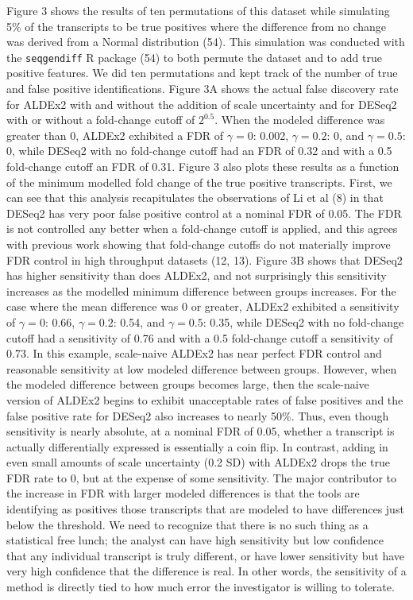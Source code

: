 \documentclass[
]{article}
\begin{document}
Figure 3 shows the results of ten permutations of this dataset while
simulating 5\% of the transcripts to be true positives where the
difference from no change was derived from a Normal distribution (54).
This simulation was conducted with the \texttt{seqgendiff} R package
(54) to both permute the dataset and to add true positive features. We
did ten permutations and kept track of the number of true and false
positive identifications. Figure 3A shows the actual false discovery
rate for ALDEx2 with and without the addition of scale uncertainty and
for DESeq2 with or without a fold-change cutoff of \(2^{0.5}\). When the
modeled difference was greater than 0, ALDEx2 exhibited a FDR of
\(\gamma = 0\): 0.002, \(\gamma = 0.2\): 0, and \(\gamma = 0.5\): 0,
while DESeq2 with no fold-change cutoff had an FDR of 0.32 and with a
0.5 fold-change cutoff an FDR of 0.31. Figure 3 also plots these results
as a function of the minimum modelled fold change of the true positive
transcripts. First, we can see that this analysis recapitulates the
observations of Li et al (8) in that DESeq2 has very poor false positive
control at a nominal FDR of 0.05. The FDR is not controlled any better
when a fold-change cutoff is applied, and this agrees with previous work
showing that fold-change cutoffs do not materially improve FDR control
in high throughput datasets (12, 13). Figure 3B shows that DESeq2 has
higher sensitivity than does ALDEx2, and not surprisingly this
sensitivity increases as the modelled minimum difference between groups
increases. For the case where the mean difference was 0 or greater,
ALDEx2 exhibited a sensitivity of \(\gamma = 0\): 0.66,
\(\gamma = 0.2\): 0.54, and \(\gamma = 0.5\): 0.35, while DESeq2 with no
fold-change cutoff had a sensitivity of 0.76 and with a 0.5 fold-change
cutoff a sensitivity of 0.73. In this example, scale-naive ALDEx2 has
near perfect FDR control and reasonable sensitivity at low modeled
difference between groups. However, when the modeled difference between
groups becomes large, then the scale-naive version of ALDEx2 begins to
exhibit unacceptable rates of false positives and the false positive
rate for DESeq2 also increases to nearly 50\%. Thus, even though
sensitivity is nearly absolute, at a nominal FDR of 0.05, whether a
transcript is actually differentially expressed is essentially a coin
flip. In contrast, adding in even small amounts of scale uncertainty
(0.2 SD) with ALDEx2 drops the true FDR rate to 0, but at the expense of
some sensitivity. The major contributor to the increase in FDR with
larger modeled differences is that the tools are identifying as
positives those transcripts that are modeled to have differences just
below the threshold. We need to recognize that there is no such thing as
a statistical free lunch; the analyst can have high sensitivity but low
confidence that any individual transcript is truly different, or have
lower sensitivity but have very high confidence that the difference is
real. In other words, the sensitivity of a method is directly tied to
how much error the investigator is willing to tolerate.
\end{document}

